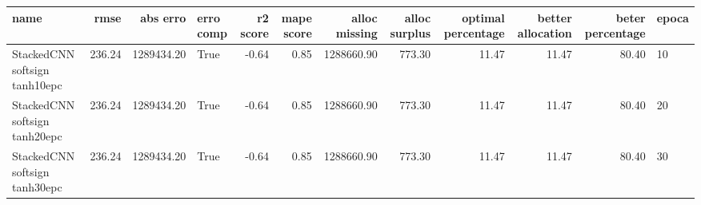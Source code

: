 \begin{tabular}{lrrlrrrrrrrl}
\toprule
name & rmse & abs erro & erro comp & r2 score & mape score & alloc missing & alloc surplus & optimal percentage & better allocation & beter percentage & epoca \\
\midrule
StackedCNN softsign tanh10epc & 236.24 & 1289434.20 & True & -0.64 & 0.85 & 1288660.90 & 773.30 & 11.47 & 11.47 & 80.40 & 10 \\
StackedCNN softsign tanh20epc & 236.24 & 1289434.20 & True & -0.64 & 0.85 & 1288660.90 & 773.30 & 11.47 & 11.47 & 80.40 & 20 \\
StackedCNN softsign tanh30epc & 236.24 & 1289434.20 & True & -0.64 & 0.85 & 1288660.90 & 773.30 & 11.47 & 11.47 & 80.40 & 30 \\
\bottomrule
\end{tabular}
